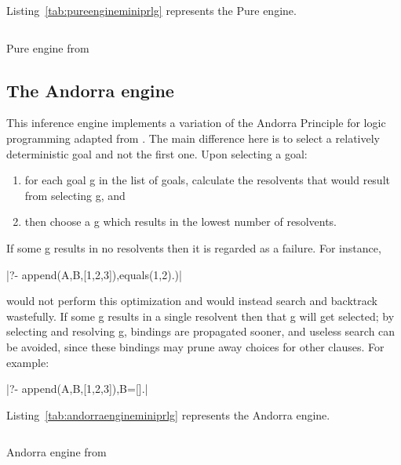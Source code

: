 \documentclass[thesis-solanki.tex]{files}
\begin{document}
Listing~\ref{tab:pureengineminiprlg} represents the Pure engine.

\begin{code-list}[H]
\begin{singlespace}
\inputminted[linenos, firstline=26, lastline=46]{haskell}{haskell-proto3-absurd-silicon.hs}
\end{singlespace}
\caption{Pure engine from  \cite{website:mini-prolog-hugs98}}
\label{tab:pureengineminiprlg}
\end{code-list}

\subsection{The Andorra engine}
This inference engine implements a variation of the Andorra Principle for logic programming adapted from \cite{haridi1990kernel}. 
The main difference here is to select a relatively deterministic goal and not the first one. Upon selecting a goal:
\begin{enumerate}
\item for each goal g in the list of goals, calculate the resolvents that would result from selecting g, and

\item then choose a g which results in the lowest number of resolvents.
\end{enumerate}

If some g results in no resolvents then it is regarded as a failure. For instance,

|?- append(A,B,[1,2,3]),equals(1,2).)|

 would not perform this optimization and would instead search and backtrack wastefully.  
If some g results in a single resolvent then that g will get selected;
by selecting and resolving g, bindings are propagated sooner, and useless
search can be avoided, since these bindings may prune away choices for
other clauses.  For example: 

|?- append(A,B,[1,2,3]),B=[].|

Listing~\ref{tab:andorraengineminiprlg} represents the Andorra engine.

\begin{code-list}[H]
\begin{singlespace}
\inputminted[linenos, firstline=29, lastline=64]{haskell}{haskell-proto3-diatomic-unbank.hs}
\end{singlespace}
\caption{Andorra engine from  \cite{website:mini-prolog-hugs98}}
\label{tab:andorraengineminiprlg}
\end{code-list}
\end{document}
